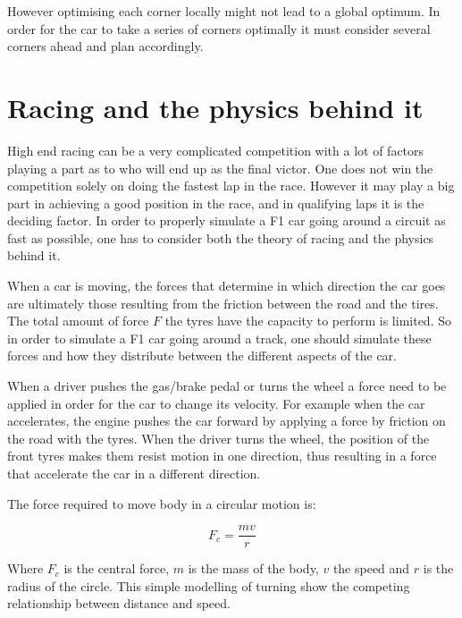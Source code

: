 However optimising each corner locally might not lead to a global optimum. In order for the car to take a series of corners optimally it must consider several corners ahead and plan accordingly. 

\section{Racing and the physics behind it}
High end racing can be a very complicated competition with a lot of factors playing a part as to who will end up as the final victor. One does not win the competition solely on doing the fastest lap in the race. However it may play a big part in achieving a good position in the race, and in qualifying laps it is the deciding factor. In order to properly simulate a F1 car going around a circuit as fast as possible, one has to consider both the theory of racing and the physics behind it.

When a car is moving, the forces that determine in which direction the car goes are ultimately those resulting from the friction between the road and the tires. The total amount of force $F$ the tyres have the capacity to perform is limited. So in order to simulate a F1 car going around a track, one should simulate these forces and how they distribute between the different aspects of the car.

When a driver pushes the gas/brake pedal or turns the wheel a force need to be applied in order for the car to change its velocity. For example when the car accelerates, the engine pushes the car forward by applying a force by friction on the road with the tyres. When the driver turns the wheel, the position of the front tyres makes them resist motion in one direction, thus resulting in a force that accelerate the car in a different direction.

The force required to move body in a circular motion is:

\[
F_c = \frac{mv}{r}
\]

Where $F_c$ is the central force, $m$ is the mass of the body, $v$ the speed and $r$ is the radius of the circle. This simple modelling of turning show the competing relationship between distance and speed.

